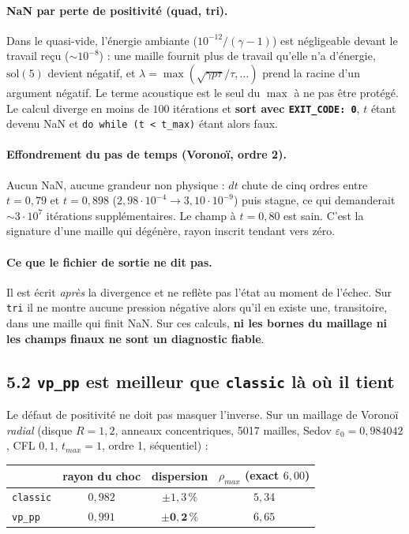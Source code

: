 \documentclass[11pt,a4paper]{article}
\begin{document}
\paragraph{NaN par perte de positivité (quad, tri).} Dans le quasi-vide, l'énergie
ambiante ($10^{-12}/(\gamma-1)$) est négligeable devant le travail reçu
($\sim\!10^{-8}$) : une maille fournit plus de travail qu'elle n'a d'énergie,
$\mathrm{sol}(5)$ devient négatif, et $\lambda=\max(\sqrt{\gamma p\tau}/\tau,\dots)$
prend la racine d'un argument négatif. Le terme acoustique est le seul du $\max$ à ne
pas être protégé. Le calcul diverge en moins de $100$ itérations et \textbf{sort avec
\texttt{EXIT\_CODE: 0}}, $t$ étant devenu NaN et \texttt{do while (t < t\_max)} étant
alors faux.

\paragraph{Effondrement du pas de temps (Voronoï, ordre 2).} Aucun NaN, aucune
grandeur non physique : $dt$ chute de cinq ordres entre $t=0{,}79$ et $t=0{,}898$
($2{,}98\cdot10^{-4} \to 3{,}10\cdot10^{-9}$) puis stagne, ce qui demanderait
$\sim\!3\cdot10^{7}$ itérations supplémentaires. Le champ à $t=0{,}80$ est sain. C'est
la signature d'une maille qui dégénère, rayon inscrit tendant vers zéro.

\paragraph{Ce que le fichier de sortie ne dit pas.} Il est écrit \emph{après} la
divergence et ne reflète pas l'état au moment de l'échec. Sur \texttt{tri} il ne
montre aucune pression négative alors qu'il en existe une, transitoire, dans une
maille qui finit NaN. Sur ces calculs, \textbf{ni les bornes du maillage ni les champs
finaux ne sont un diagnostic fiable}.

\subsection*{5.2 \texttt{vp\_pp} est meilleur que \texttt{classic} là où il tient}

Le défaut de positivité ne doit pas masquer l'inverse. Sur un maillage de Voronoï
\emph{radial} (disque $R=1{,}2$, anneaux concentriques, 5017 mailles, Sedov
$\varepsilon_0=0{,}984042$, CFL $0{,}1$, $t_{max}=1$, ordre 1, séquentiel) :

\begin{table}[h]\centering
\begin{tabular}{lccc}
\toprule
 & rayon du choc & dispersion & $\rho_{max}$ (exact $6{,}00$) \\
\midrule
\texttt{classic} & $0{,}982$ & $\pm1{,}3\,\%$ & $5{,}34$ \\
\texttt{vp\_pp}  & $0{,}991$ & $\mathbf{\pm0{,}2\,\%}$ & $6{,}65$ \\
\bottomrule
\end{tabular}
\end{table}
\end{document}
